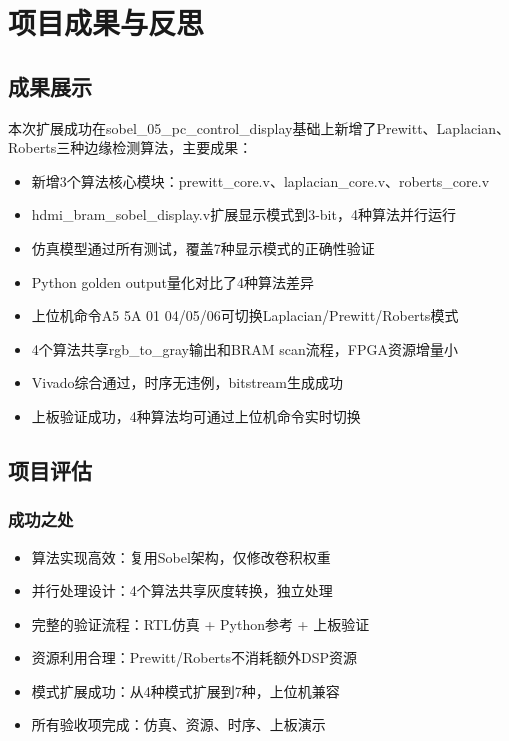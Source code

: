 
\section{项目成果与反思}

\subsection{成果展示}

本次扩展成功在sobel\_05\_pc\_control\_display基础上新增了Prewitt、Laplacian、Roberts三种边缘检测算法，主要成果：

\begin{itemize}
    \item 新增3个算法核心模块：prewitt\_core.v、laplacian\_core.v、roberts\_core.v
    \item hdmi\_bram\_sobel\_display.v扩展显示模式到3-bit，4种算法并行运行
    \item 仿真模型通过所有测试，覆盖7种显示模式的正确性验证
    \item Python golden output量化对比了4种算法差异
    \item 上位机命令A5 5A 01 04/05/06可切换Laplacian/Prewitt/Roberts模式
    \item 4个算法共享rgb\_to\_gray输出和BRAM scan流程，FPGA资源增量小
    \item Vivado综合通过，时序无违例，bitstream生成成功
    \item 上板验证成功，4种算法均可通过上位机命令实时切换
\end{itemize}

\subsection{项目评估}

\subsubsection{成功之处}

\begin{itemize}
    \item 算法实现高效：复用Sobel架构，仅修改卷积权重
    \item 并行处理设计：4个算法共享灰度转换，独立处理
    \item 完整的验证流程：RTL仿真 + Python参考 + 上板验证
    \item 资源利用合理：Prewitt/Roberts不消耗额外DSP资源
    \item 模式扩展成功：从4种模式扩展到7种，上位机兼容
    \item 所有验收项完成：仿真、资源、时序、上板演示
\end{itemize}

